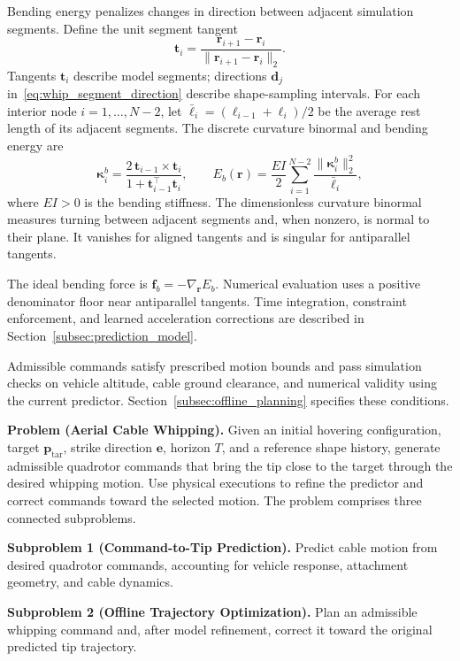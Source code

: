 \documentclass[letterpaper, 10 pt, conference]{ieeeconf}
\begin{document}
Bending energy penalizes changes in direction between adjacent
simulation segments. Define the unit segment tangent
\[
\mathbf t_i
=\frac{\mathbf r_{i+1}-\mathbf r_i}
{\|\mathbf r_{i+1}-\mathbf r_i\|_2}.
\]
Tangents $\mathbf t_i$ describe model segments; directions
$\mathbf d_j$ in~\eqref{eq:whip_segment_direction} describe
shape-sampling intervals.
For each interior node $i=1,\ldots,N-2$, let
$\bar\ell_i=(\ell_{i-1}+\ell_i)/2$ be the average rest length
of its adjacent segments.
The discrete curvature binormal and bending energy are
\begin{equation}
\boldsymbol\kappa_i^b
=\frac{2\,\mathbf t_{i-1}\times\mathbf t_i}
{1+\mathbf t_{i-1}^\top\mathbf t_i},
\qquad
E_b(\mathbf r)=\frac{EI}{2}
\sum_{i=1}^{N-2}\frac{\|\boldsymbol\kappa_i^b\|_2^2}{\bar\ell_i},
\label{eq:bending_energy}
\end{equation}
where $EI>0$ is the bending stiffness.
The dimensionless curvature binormal measures turning between
adjacent segments and, when nonzero, is normal to their plane.
It vanishes for aligned tangents and is singular for
antiparallel tangents.

The ideal bending force is
$\mathbf f_b=-\nabla_{\mathbf r}E_b$.
Numerical evaluation uses a positive denominator floor near
antiparallel tangents.
Time integration, constraint enforcement, and learned
acceleration corrections are described in
Section~\ref{subsec:prediction_model}.

Admissible commands satisfy prescribed motion bounds and pass
simulation checks on vehicle altitude, cable ground clearance,
and numerical validity using the current predictor.
Section~\ref{subsec:offline_planning} specifies these conditions.

\noindent\textbf{Problem (Aerial Cable Whipping).}
Given an initial hovering configuration, target
$\mathbf p_{\mathrm{tar}}$, strike direction $\mathbf e$,
horizon $T$, and a reference shape history, generate admissible
quadrotor commands that bring the tip close to the target through
the desired whipping motion.
Use physical executions to refine the predictor and correct
commands toward the selected motion. The problem comprises
three connected subproblems.

\noindent\textbf{Subproblem 1 (Command-to-Tip Prediction).}
Predict cable motion from desired quadrotor commands, accounting
for vehicle response, attachment geometry, and cable dynamics.

\noindent\textbf{Subproblem 2 (Offline Trajectory Optimization).}
Plan an admissible whipping command and, after model refinement,
correct it toward the original predicted tip trajectory.
\end{document}
